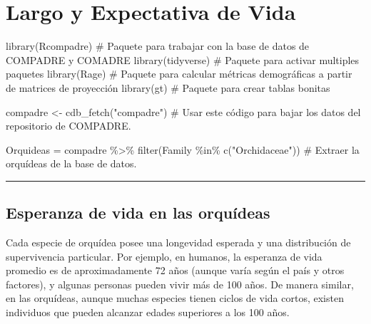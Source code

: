 \documentclass[
  12pt,
  letterpaper,
]{book}
\author{}
\date{}
\newenvironment{Shaded}{\begin{snugshade}}{\end{snugshade}}
\newcommand{\CommentTok}[1]{\textcolor[rgb]{0.37,0.37,0.37}{#1}}
\newcommand{\FunctionTok}[1]{\textcolor[rgb]{0.28,0.35,0.67}{#1}}
\newcommand{\NormalTok}[1]{\textcolor[rgb]{0.00,0.23,0.31}{#1}}
\newcommand{\OtherTok}[1]{\textcolor[rgb]{0.00,0.23,0.31}{#1}}
\newcommand{\SpecialCharTok}[1]{\textcolor[rgb]{0.37,0.37,0.37}{#1}}
\newcommand{\StringTok}[1]{\textcolor[rgb]{0.13,0.47,0.30}{#1}}
\renewcommand*\contentsname{Table of contents}
\newcommand\contentsname{Table of contents}
\begin{document}
\frontmatter

\renewcommand*\contentsname{Table of contents}
{
\hypersetup{linkcolor=}
\setcounter{tocdepth}{2}
\tableofcontents
}

\mainmatter
\chapter{Largo y Expectativa de Vida}\label{largo-y-expectativa-de-vida}

\begin{Shaded}
\begin{Highlighting}[]
\FunctionTok{library}\NormalTok{(Rcompadre) }\CommentTok{\# Paquete para trabajar con la base de datos de COMPADRE y COMADRE}
\FunctionTok{library}\NormalTok{(tidyverse) }\CommentTok{\# Paquete para activar multiples paquetes}
\FunctionTok{library}\NormalTok{(Rage) }\CommentTok{\# Paquete para calcular métricas demográficas a partir de matrices de proyección}
\FunctionTok{library}\NormalTok{(gt) }\CommentTok{\# Paquete para crear tablas bonitas}
\end{Highlighting}
\end{Shaded}

\begin{Shaded}
\begin{Highlighting}[]
\NormalTok{compadre }\OtherTok{\textless{}{-}} \FunctionTok{cdb\_fetch}\NormalTok{(}\StringTok{"compadre"}\NormalTok{) }\CommentTok{\# Usar este código para bajar los datos del repositorio de COMPADRE.}


\NormalTok{Orquideas }\OtherTok{=}\NormalTok{ compadre }\SpecialCharTok{\%\textgreater{}\%}
  \FunctionTok{filter}\NormalTok{(Family }\SpecialCharTok{\%in\%} \FunctionTok{c}\NormalTok{(}\StringTok{"Orchidaceae"}\NormalTok{)) }\CommentTok{\# Extraer la orquídeas de la base de datos.}
\end{Highlighting}
\end{Shaded}

\begin{center}\rule{0.5\linewidth}{0.5pt}\end{center}

\section{Esperanza de vida en las
orquídeas}\label{esperanza-de-vida-en-las-orquuxeddeas}

Cada especie de orquídea posee una longevidad esperada y una
distribución de supervivencia particular. Por ejemplo, en humanos, la
esperanza de vida promedio es de aproximadamente 72 años (aunque varía
según el país y otros factores), y algunas personas pueden vivir más de
100 años. De manera similar, en las orquídeas, aunque muchas especies
tienen ciclos de vida cortos, existen individuos que pueden alcanzar
edades superiores a los 100 años.
\end{document}
